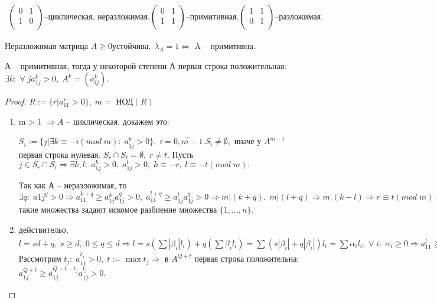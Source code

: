 \begin{example}
		\begin{gather*}
			\begin{pmatrix}
			  0 & 1\\
			  1 & 0 \\
			\end{pmatrix} \text{--циклическая, неразложимая.}
			\begin{pmatrix}
			  0 & 1\\
			  1 & 1 \\
			\end{pmatrix} \text{--примитивная.}
			\begin{pmatrix}
			  1 & 1\\
			  0 & 1 \\
			\end{pmatrix} \text{--разложимая.}
		\end{gather*}
\end{example}

\begin{theorem}
	Неразложимая матрица $A \geq 0 устойчива, \; \lambda_A = 1 \Longleftrightarrow $ A -- примитивна.
\end{theorem}

\begin{lemma}
	А -- примитивная, тогда у некоторой степени А первая строка положительная: $\exists k: \; \forall \; j a_{1j}^k > 0, \; A^k = (a_{ij}^k)$.
\end{lemma}

\begin{proof}
	$R := \{ r | a_{11}^r > 0\}, \; m = \text{ НОД}(R)$

	\begin{enumerate}
		\item m > 1 $\Rightarrow A$ -- циклическая, докажем это:

		$S_i := \{ j | \exists k \equiv -i (mod \; m): \; a_{1j}^k > 0\}, \; i = \bar{0, m - 1}. S_i \neq \emptyset, $ иначе у $A^{m - i}$ первая строка нулевая. $S_r \cap S_t = \emptyset, \; r \neq t.$ Пусть $j \in S_r \cap S_i \Rightarrow \exists k, l: \; a_{1j}^k > 0, \; a_{1j}^l > 0, \; k \equiv -r, \; l \equiv -t (mod \; m).$

		Так как А -- неразложимая, то $\exists q: \; a{1j}^q > 0 \Rightarrow a_{11}^{k + q} \geq a_{1j}^k a_{1j}^q > 0, \; a_{11}^{l + q} \geq a_{1j}^l a_{1j}^q > 0 \Rightarrow m | (k + q), \; m | (l + q) \Rightarrow m | (k - l) \Rightarrow r \equiv t (mod \; m) \Rightarrow$ такие множества задают искомое разбиение множества $\{ 1, \ldots, n\}$.

		\item действительо, $l = sd + q, \; s \geq d, \; 0 \leq q \leq d \Rightarrow l = s (\sum |\beta_i|l_i) + q (\sum \beta_i l_i) = \sum (s|\beta_i| + q|\beta_i|)l_i = \sum\alpha_i l_i, \; \forall \; i: \; \alpha_i \geq 0 \Rightarrow a_{11}^l \geq \prod (a_{11}^{l_i})^{\alpha_i} > 0.$ Рассмотрим $t_j: \; a_{1j}^{t_j} > 0, \; t := \max t_j \Rightarrow $ в $A^{Q + t}$ первая строка положительна: $a_{1j}^{Q + t} \geq a_{1j}^{Q + t - t_j}a_{1j}^{t_j} > 0.$
	\end{enumerate}
\end{proof}

